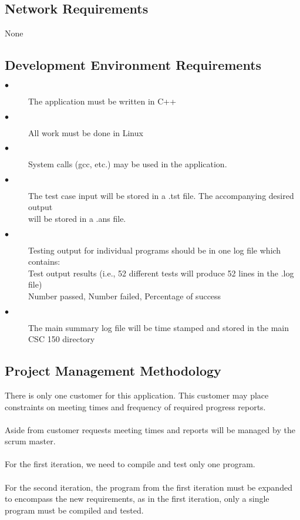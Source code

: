 \subsection{Network Requirements}
None


\subsection{Development Environment Requirements}

\begin{description}
\item [$\bullet$] The application must be written in C++
\item [$\bullet$] All work must be done in Linux
\item [$\bullet$] System calls (gcc, etc.) may be used in the application.
\item [$\bullet$] The test case input will be stored in a .tst file. The accompanying
 desired output \\ will be stored in a .ans file.
\item [$\bullet$] Testing output for individual programs should be in one log file which contains: \\
\hspace{4ex} Test output results (i.e., 52 different tests will produce 52 lines in the .log file) \\
\hspace{4ex} Number passed, Number failed, Percentage of success
\item [$\bullet$] The main summary log file will be time stamped and stored in the main CSC 150 directory
\end{description}


\subsection{Project  Management Methodology}
There is only one customer for this application. This customer may place constraints
on meeting times and frequency of required progress reports. 
\\
\\Aside from customer
requests meeting times and reports will be managed by the scrum master.
\\ 
\\For the first iteration, we need to compile and test only one program. 
\\
\\For the second iteration, the program from the first iteration must be expanded to encompass the new requirements, 
as in the first iteration, only a single program must be compiled and tested.

